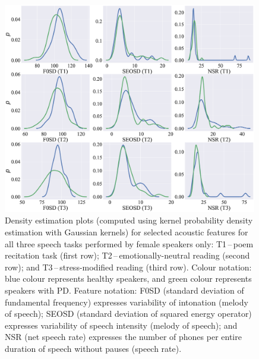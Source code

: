\begin{figure}[htb!]
	\centering
	\scriptsize
	\includegraphics[width=0.99\textwidth]{pictures/ch4_comparisons_females.eps}
	\caption[Density estimation plots for female speakers.]{Density estimation plots (computed using kernel probability density estimation with Gaussian kernels) for selected acoustic features for all three speech tasks performed by female speakers only: T1\,--\,poem recitation task (first row); T2\,--\,emotionally-neutral reading (second row); and T3\,--\,stress-modified reading (third row). Colour notation: blue colour represents healthy speakers, and green colour represents speakers with PD. Feature notation: F0SD (standard deviation of fundamental frequency) expresses variability of intonation (melody of speech); SEOSD (standard deviation of squared energy operator) expresses variability of speech intensity (melody of speech); and NSR (net speech rate) expresses the number of phones per entire duration of speech without pauses (speech rate).}
	\label{fig:ch4_comparisons_females}
\end{figure}

